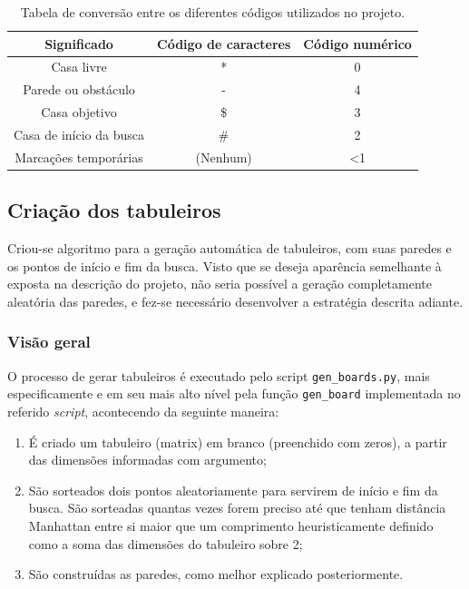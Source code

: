 \documentclass[12pt]{article}
\begin{document}
\begin{table}[h!]
	\label{tab:codigo}
	\centering
	\begin{tabular}{|c|c|c|}
		\hline
		\textbf{Significado} & \textbf{Código de caracteres} & \textbf{Código numérico}\\
		\hline
		Casa livre & * & 0\\
		Parede ou obstáculo & - & 4\\
		Casa objetivo & \$ & 3\\
		Casa de início da busca & \# & 2\\
		Marcações temporárias & (Nenhum) & \textless 1\\
		\hline

	\end{tabular}
	\caption{Tabela de conversão entre os diferentes códigos utilizados no projeto.}
\end{table}

\subsection{Criação dos tabuleiros}
Criou-se algoritmo para a geração automática de tabuleiros, com suas paredes e os pontos de início e fim da busca. Visto que se deseja aparência semelhante à exposta na descrição do projeto, não seria possível a geração completamente aleatória das paredes, e fez-se necessário desenvolver a estratégia descrita adiante.

\subsubsection{Visão geral}
 O processo de gerar tabuleiros é executado pelo script \texttt{gen\_boards.py}, mais especificamente e em seu mais alto nível pela função \verb|gen_board| implementada no referido \emph{script}, acontecendo da seguinte maneira:

\begin{enumerate}
	\item É criado um tabuleiro (matrix) em branco (preenchido com zeros), a partir das dimensões informadas com argumento;
	\item São sorteados dois pontos aleatoriamente para servirem de início e fim da busca. São sorteadas quantas vezes forem preciso até que tenham distância Manhattan entre si maior que um comprimento heuristicamente definido como a soma das dimensões do tabuleiro sobre 2;
	\item São construídas as paredes, como melhor explicado posteriormente.
\end{enumerate}
\end{document}
